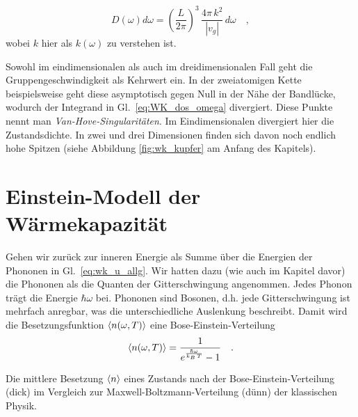 \begin{equation}
D(\omega) d\omega = \left( \frac{L}{2 \pi} \right)^3 \,     \frac{ 4 \pi \, k^2 }{|v_g|}   \, d\omega  \quad ,
\end{equation} 
wobei $k$ hier als $k(\omega)$ zu verstehen ist.

Sowohl im eindimensionalen als auch im dreidimensionalen Fall geht die Gruppengeschwindigkeit als Kehrwert ein. In der zweiatomigen Kette beispielsweise geht diese asymptotisch gegen Null in der Nähe der Bandlücke, wodurch der Integrand in Gl.~\ref{eq:WK_dos_omega} divergiert. Diese Punkte nennt man \emph{Van-Hove-Singularitäten}. Im Eindimensionalen divergiert hier die Zustandsdichte. In zwei und drei Dimensionen finden sich davon noch endlich hohe Spitzen (siehe Abbildung \ref{fig:wk_kupfer} am Anfang des Kapitels).





\section{Einstein-Modell der Wärmekapazität}

Gehen wir zurück zur inneren Energie als Summe über die Energien der Phononen in Gl.~\ref{eq:wk_u_allg}. Wir hatten dazu (wie auch im Kapitel davor) die Phononen als die Quanten der Gitterschwingung angenommen. Jedes Phonon trägt die Energie $\hbar \omega$ bei. Phononen sind Bosonen, d.h. jede Gitterschwingung ist mehrfach anregbar, was die unterschiedliche Auslenkung beschreibt. Damit wird die Besetzungsfunktion $\braket{n (\omega,T) }$ eine Bose-Einstein-Verteilung
\begin{equation}
\braket{n (\omega,T) } = \frac{1}{e^{\frac{\hbar \omega}{k_B \, T} }- 1} \quad .
\end{equation}

\begin{marginfigure}

\caption{Die mittlere Besetzung $\braket{n}$ eines Zustands nach der Bose-Einstein-Verteilung (dick) im Vergleich zur Maxwell-Boltzmann-Verteilung (dünn) der klassischen Physik.}
\end{marginfigure}



